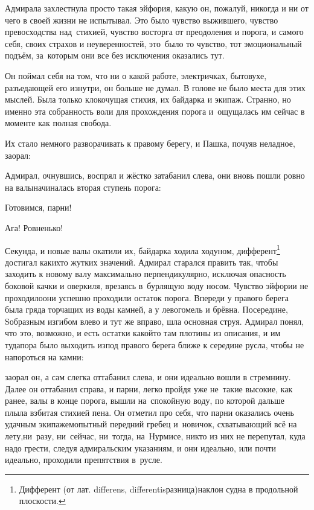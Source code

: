 Адмирала захлестнула просто такая эйфория, какую он, пожалуй, никогда и ни от чего в своей жизни не испытывал. Это было чувство выжившего, чувство превосходства над~стихией, чувство восторга от преодоления и порога, и самого себя, своих страхов и неуверенностей, это~было то чувство, тот эмоциональный подъём, за~которым они все без исключения оказались тут. 

Он поймал себя на том, что ни о какой работе, электричках, бытовухе, разъедающей его изнутри, он больше не думал. В голове не было места для этих мыслей. Была только клокочущая стихия, их байдарка и экипаж. Странно, но именно эта собранность воли для прохождения порога и~ощущалась им сейчас в моменте как полная свобода.

Их стало немного разворачивать к правому берегу, и Пашка, почуяв неладное, заорал:



Адмирал, очнувшись, воспрял и жёстко затабанил слева, они вновь пошли ровно на валы\mdash начиналась вторая ступень порога:

\diagdash Готовимся, парни!

\diagdash Ага! Ровненько!

\renewcommand*{\thefootnote}{\fnsymbol{footnote}}
\setcounter{footnote}{0}
Секунда, и новые валы окатили их, байдарка ходила ходуном, дифферент\footnote{Дифферент (от лат. differens, differentis\mdash разница)\mdash наклон судна в продольной плоскости.} достигал каких\sdash то жутких значений. Адмирал старался править так, чтобы заходить к новому валу максимально перпендикулярно, исключая опасность боковой качки и оверкиля, врезаясь в~бурлящую воду носом. Чувство эйфории не проходило\mdash они успешно проходили остаток порога. Впереди у правого берега была гряда торчащих из воды камней, а у левого\mdash мель и брёвна. Посередине, S\sdash образным изгибом влево и тут же вправо, шла основная струя. Адмирал понял, что это, возможно, и есть остатки какой\sdash то там плотины из описания, и им туда\mdash пора было выходить из\sdash под правого берега ближе к середине русла, чтобы не напороться на камни:

\mdash заорал он, а сам слегка оттабанил слева, и они идеально вошли в стремнину. Далее он оттабанил справа, и парни, легко пройдя уже не~такие высокие, как ранее, валы в конце порога, вышли на~спокойную воду, по которой дальше плыла взбитая стихией пена. Он отметил про себя, что парни оказались очень удачным экипажем\mdash опытный передний гребец и~новичок, схватывающий всё на лету,\mdash ни~разу, ни~сейчас, ни~тогда, на~Нурмисе, никто из них не перепутал, куда надо грести, следуя адмиральским указаниям, и они идеально, или почти идеально, проходили препятствия в~русле.

